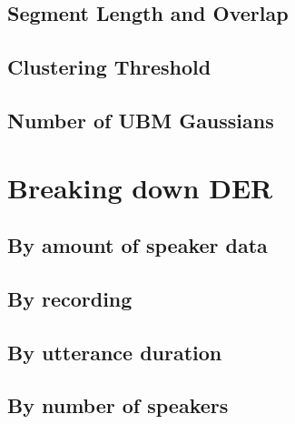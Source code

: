 		\subsection{Segment Length and Overlap}
		\subsection{Clustering Threshold}
		\subsection{Number of UBM Gaussians}
	
	\section{Breaking down DER}
		\subsection{By amount of speaker data}
		\subsection{By recording}
		\subsection{By utterance duration}
		\subsection{By number of speakers}